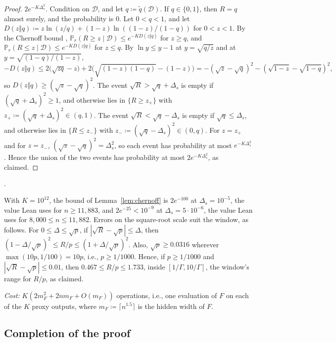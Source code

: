 \documentclass[10pt]{article}
\newenvironment{leanitems}{\par\smallskip\relscale{0.78}\color{gray}\hypersetup{urlcolor=gray}\raggedright%
  \begin{list}{}{\setlength{\leftmargin}{2em}\setlength{\labelwidth}{1.6em}%
  \setlength{\labelsep}{0.4em}\setlength{\itemsep}{0pt}\setlength{\topsep}{0pt}%
  \setlength{\parsep}{0pt}}}{\end{list}\par\medskip}
\newcommand{\Dd}{\mathcal{D}}\newcommand{\Ee}{\mathcal{E}}
\newcommand{\PP}{\mathbb{P}}
\begin{document}
\begin{enumerate}[leftmargin=*,itemsep=8pt,topsep=10pt plus 2pt]
\begin{proof}
  $2e^{-K\Delta_s^2}$. Condition on $\Dd$, and let $q\coloneqq\tilde q(\Dd)$.
  If $q\in\{0,1\}$, then $R=q$ almost surely, and the probability is $0$. Let
  $0<q<1$, and let $D(z\Vert q)\coloneqq z\ln(z/q)+(1-z)\ln((1-z)/(1-q))$ for
  $0<z<1$. By the Chernoff bound \citep[Lemma~1]{okamoto-1958},
  $\PP_r(R\ge z\mid\Dd)\le e^{-KD(z\Vert q)}$ for $z\ge q$, and
  $\PP_r(R\le z\mid\Dd)\le e^{-KD(z\Vert q)}$ for $z\le q$. By
  $\ln y\le y-1$ at $y=\sqrt{q/z}$ and at $y=\sqrt{(1-q)/(1-z)}$,
  \[-D(z\Vert q)\le2\bigl(\sqrt{zq}-z\bigr)+2\bigl(\sqrt{(1-z)(1-q)}-(1-z)\bigr)
  =-(\sqrt z-\sqrt q)^2-(\sqrt{1-z}-\sqrt{1-q})^2,\]
  so $D(z\Vert q)\ge(\sqrt z-\sqrt q)^2$. The event
  $\sqrt R>\sqrt q+\Delta_s$ is empty if $(\sqrt q+\Delta_s)^2\ge1$, and
  otherwise lies in $\{R\ge z_+\}$ with $z_+\coloneqq(\sqrt q+\Delta_s)^2\in(q,1)$.
  The event $\sqrt R<\sqrt q-\Delta_s$ is empty if $\sqrt q\le\Delta_s$, and
  otherwise lies in $\{R\le z_-\}$ with $z_-\coloneqq(\sqrt q-\Delta_s)^2\in(0,q)$.
  For $z=z_+$ and for $z=z_-$, $(\sqrt z-\sqrt q)^2=\Delta_s^2$, so each event has
  probability at most $e^{-K\Delta_s^2}$. Hence the union of the two events
  has probability at most $2e^{-K\Delta_s^2}$, as claimed.
  \end{proof}
  \begin{leanitems}
  .
  \end{leanitems}
  With $K=10^{12}$, the bound of Lemma~\ref{lem:chernoff} is $2e^{-100}$ at
  $\Delta_s=10^{-5}$, the value Lean uses for $n\ge11{,}883$, and
  $2e^{-25}<10^{-9}$ at $\Delta_s=5\cdot10^{-6}$, the value Lean uses for
  $8{,}000\le n\le11{,}882$. Errors on the square-root scale
  suit the window, as follows. For $0\le\Delta\le\sqrt p$, if
  $|\sqrt R-\sqrt p|\le\Delta$, then
  $(1-\Delta/\sqrt p)^2\le R/p\le(1+\Delta/\sqrt p)^2$. Also,
  $\sqrt p\ge0.0316$ wherever $\max(10p,1/100)=10p$, i.e.,
  $p\ge1/1000$. Hence, if $p\ge1/1000$ and $|\sqrt R-\sqrt p|\le0.01$, then
  $0.467\le R/p\le1.733$, inside $[1/\Gamma,10/\Gamma]$, the window's range for
  $R/p$, as claimed.

  \emph{Cost:} $K(2m_F^2+2nm_F+O(m_F))$ operations, i.e., one evaluation of $F$
  on each of the $K$ proxy outputs, where $m_F\coloneqq \lceil n^{1.5}\rceil$ is the hidden
  width of $F$.
\end{enumerate}

\subsection{Completion of the proof}
\end{document}
